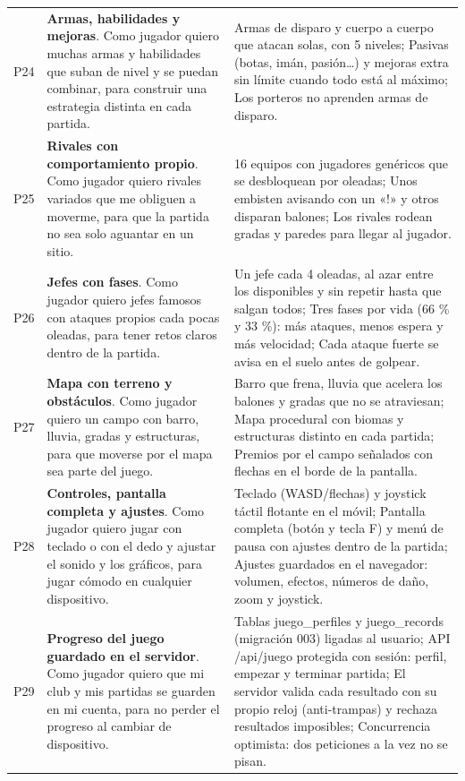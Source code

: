 {\begin{longtable}{@{}L{0.8cm} L{6.4cm} L{6.6cm}@{}}
P24 & \textbf{Armas, habilidades y mejoras}. Como jugador quiero muchas armas y habilidades que suban de nivel y se puedan combinar, para construir una estrategia distinta en cada partida. & Armas de disparo y cuerpo a cuerpo que atacan solas, con 5 niveles; Pasivas (botas, imán, pasión…) y mejoras extra sin límite cuando todo está al máximo; Los porteros no aprenden armas de disparo. \\
P25 & \textbf{Rivales con comportamiento propio}. Como jugador quiero rivales variados que me obliguen a moverme, para que la partida no sea solo aguantar en un sitio. & 16 equipos con jugadores genéricos que se desbloquean por oleadas; Unos embisten avisando con un «!» y otros disparan balones; Los rivales rodean gradas y paredes para llegar al jugador. \\
P26 & \textbf{Jefes con fases}. Como jugador quiero jefes famosos con ataques propios cada pocas oleadas, para tener retos claros dentro de la partida. & Un jefe cada 4 oleadas, al azar entre los disponibles y sin repetir hasta que salgan todos; Tres fases por vida (66 \% y 33 \%): más ataques, menos espera y más velocidad; Cada ataque fuerte se avisa en el suelo antes de golpear. \\
P27 & \textbf{Mapa con terreno y obstáculos}. Como jugador quiero un campo con barro, lluvia, gradas y estructuras, para que moverse por el mapa sea parte del juego. & Barro que frena, lluvia que acelera los balones y gradas que no se atraviesan; Mapa procedural con biomas y estructuras distinto en cada partida; Premios por el campo señalados con flechas en el borde de la pantalla. \\
P28 & \textbf{Controles, pantalla completa y ajustes}. Como jugador quiero jugar con teclado o con el dedo y ajustar el sonido y los gráficos, para jugar cómodo en cualquier dispositivo. & Teclado (WASD/flechas) y joystick táctil flotante en el móvil; Pantalla completa (botón y tecla F) y menú de pausa con ajustes dentro de la partida; Ajustes guardados en el navegador: volumen, efectos, números de daño, zoom y joystick. \\
P29 & \textbf{Progreso del juego guardado en el servidor}. Como jugador quiero que mi club y mis partidas se guarden en mi cuenta, para no perder el progreso al cambiar de dispositivo. & Tablas juego\_perfiles y juego\_records (migración 003) ligadas al usuario; API /api/juego protegida con sesión: perfil, empezar y terminar partida; El servidor valida cada resultado con su propio reloj (anti-trampas) y rechaza resultados imposibles; Concurrencia optimista: dos peticiones a la vez no se pisan. \\

\end{longtable}}
